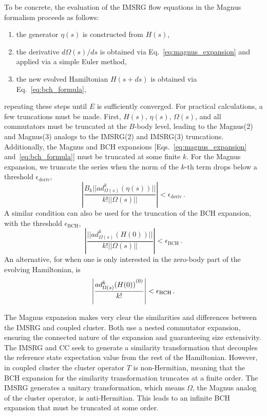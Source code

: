 To be concrete, the evaluation of the IMSRG flow equations in the Magnus formalism
proceeds as follows:
\begin{enumerate}
  \item the generator $\eta(s)$ is constructed from $H(s)$,
  \item the derivative $d\Omega(s)/ds$ is obtained via Eq.~\eqref{eq:magnus_expansion}
        and applied via a simple Euler method,
  \item the new evolved Hamiltonian $H(s+ds)$ is obtained via Eq.~\eqref{eq:bch_formula},
\end{enumerate}
repeating these steps until $E$ is sufficiently converged.
For practical calculations, a few truncations must be made.
First, $H(s)$, $\eta(s)$, $\Omega(s)$, and all commutators must be truncated
at the $B$-body level,
leading to the Magnus(2) and Magnus(3) analogs to the IMSRG(2) and IMSRG(3) truncations.
Additionally, the Magnus and BCH expansions
  [Eqs.~\eqref{eq:magnus_expansion} and~\eqref{eq:bch_formula}]
must be truncated at some finite $k$.
For the Magnus expansion, we truncate the series when the norm of the $k$-th term
drops below a threshold $\epsilon_{\text{deriv}}$,
\begin{equation}
  \left\vert \frac{B_k || ad^{k}_{\Omega(s)}(\eta(s))||}{k!||\Omega(s)||} \right\vert < \epsilon_{\text{deriv}}\,.
\end{equation}
A similar condition can also be used for the truncation of the BCH expansion,
with the threshold $\epsilon_{\text{BCH}}$,
\begin{equation}
  \left\vert \frac{|| ad^{k}_{\Omega(s)}(H(0))||}{k!||\Omega(s)||} \right\vert < \epsilon_{\text{BCH}}\,.
\end{equation}
An alternative, for when one is only interested in the zero-body part of the evolving Hamiltonian,
is
\begin{equation}
  \left\vert \frac{{ad^{k}_{\Omega(s)}(H(0))}^{(0)}}{k!} \right\vert < \epsilon_{\text{BCH}}\,.
\end{equation}

The Magnus expansion makes very clear the similarities and differences between
the IMSRG and coupled cluster.
Both use a nested commutator expansion,
ensuring the connected nature of the expansion
and guaranteeing size extensivity.
The IMSRG and CC seek to generate a similarity transformation
that decouples the reference state expectation value from the rest of the Hamiltonian.
However, in coupled cluster the cluster operator $T$ is non-Hermitian,
meaning that the BCH expansion for the similarity transformation truncates at a finite order.
The IMSRG generates a unitary transformation,
which means $\Omega$, the Magnus analog of the cluster operator,
is anti-Hermitian.
This leads to an infinite BCH expansion that must be truncated at some order.

